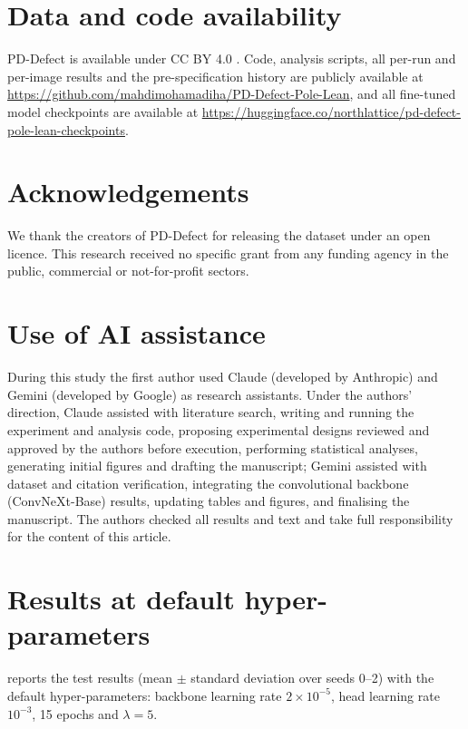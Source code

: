 \documentclass[11pt]{article}
\begin{document}
\section*{Data and code availability}
PD-Defect is available under CC BY 4.0 \citep{pddefect_data}. Code, analysis scripts, all per-run and
per-image results and the pre-specification history are publicly available at
\url{https://github.com/mahdimohamadiha/PD-Defect-Pole-Lean}, and all fine-tuned model checkpoints are
available at \url{https://huggingface.co/northlattice/pd-defect-pole-lean-checkpoints}.

\section*{Acknowledgements}
We thank the creators of PD-Defect for releasing the dataset under an open licence. This research received no specific grant from any funding agency in the public,
commercial or not-for-profit sectors.

\section*{Use of AI assistance}
During this study the first author used Claude (developed by Anthropic) and Gemini (developed by Google) as
research assistants. Under the authors' direction, Claude assisted with literature search, writing and running
the experiment and analysis code, proposing experimental designs reviewed and approved by the authors before
execution, performing statistical analyses, generating initial figures and drafting the manuscript; Gemini
assisted with dataset and citation verification, integrating the convolutional backbone (ConvNeXt-Base)
results, updating tables and figures, and finalising the manuscript. The authors checked all results and text
and take full responsibility for the content of this article.

\appendix
\renewcommand{\thetable}{\Alph{section}.\arabic{table}}
\section{Results at default hyper-parameters}
\label{app:default}
 reports the test results (mean $\pm$ standard deviation over seeds 0--2) with the default
hyper-parameters: backbone learning rate $2 \times 10^{-5}$, head learning rate $10^{-3}$, 15 epochs and
$\lambda = 5$.
\end{document}
